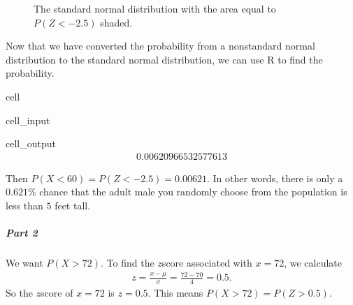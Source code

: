 \documentclass[letterpaper,10pt,english]{jupyterBook}
\begin{document}
\begin{figure}[htbp]
\centering
\capstart

\noindent{}
\caption{The standard normal distribution with the area equal to \(P(Z < -2.5)\) shaded.}\label{\detokenize{Ch4 The Normal Distribution and the Central Limit Theorem/4.3 The Normal Distribution and z-scores:stdnormal-ex8}}\end{figure}

\sphinxAtStartPar
Now that we have converted the probability from a non\sphinxhyphen{}standard normal distribution to the standard normal distribution, we can use R to find the probability.

\begin{sphinxuseclass}{cell}\begin{sphinxVerbatimInput}

\begin{sphinxuseclass}{cell_input}
\begin{sphinxVerbatim}[commandchars=\\\{\}]
\end{sphinxVerbatim}

\end{sphinxuseclass}\end{sphinxVerbatimInput}
\begin{sphinxVerbatimOutput}

\begin{sphinxuseclass}{cell_output}\begin{equation*}
\begin{split}0.00620966532577613\end{split}
\end{equation*}
\end{sphinxuseclass}\end{sphinxVerbatimOutput}

\end{sphinxuseclass}
\sphinxAtStartPar
Then \(P(X < 60) = P(Z < -2.5) = 0.00621\). In other words, there is only a \(0.621\%\) chance that the adult male you randomly choose from the population is less than \(5\) feet tall.


\subparagraph{Part 2}
\label{\detokenize{Ch4 The Normal Distribution and the Central Limit Theorem/4.3 The Normal Distribution and z-scores:id3}}
\sphinxAtStartPar
We want \(P(X > 72)\). To find the \(z\)\sphinxhyphen{}score associated with \(x = 72\), we calculate
\begin{equation*}
\begin{split} z = \frac{x - \mu}{\sigma} = \frac{72 - 70}{4} = 0.5. \end{split}
\end{equation*}
\sphinxAtStartPar
So the \(z\)\sphinxhyphen{}score of \(x = 72\) is \(z = 0.5\). This means \(P(X > 72) = P(Z > 0.5)\).
\end{document}
